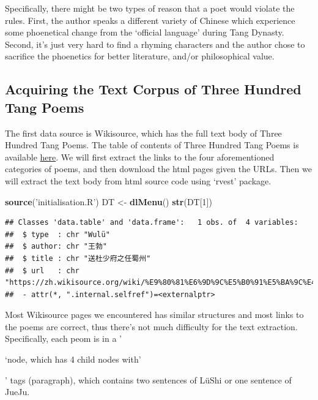 \documentclass[]{article}
\newenvironment{Shaded}{\begin{snugshade}}{\end{snugshade}}
\newcommand{\DecValTok}[1]{\textcolor[rgb]{0.00,0.00,0.81}{#1}}
\newcommand{\KeywordTok}[1]{\textcolor[rgb]{0.13,0.29,0.53}{\textbf{#1}}}
\newcommand{\NormalTok}[1]{#1}
\newcommand{\StringTok}[1]{\textcolor[rgb]{0.31,0.60,0.02}{#1}}
\begin{document}
Specifically, there might be two types of reason that a poet would
violate the rules. First, the author speaks a different variety of
Chinese which experience some phoenetical change from the `official
language' during Tang Dynasty. Second, it's just very hard to find a
rhyming characters and the author chose to sacrifice the phoenetics for
better literature, and/or philosophical value.

\hypertarget{acquiring-the-text-corpus-of-three-hundred-tang-poems}{%
\subsection{Acquiring the Text Corpus of Three Hundred Tang
Poems}\label{acquiring-the-text-corpus-of-three-hundred-tang-poems}}

The first data source is Wikisource, which has the full text body of
Three Hundred Tang Poems. The table of contents of Three Hundred Tang
Poems is available
\href{'https://zh.wikisource.org/wiki/唐詩三百首'}{here}. We will first
extract the links to the four aforementioned categories of poems, and
then download the html pages given the URLs. Then we will extract the
text body from html source code using `rvest' package.

\begin{Shaded}
\begin{Highlighting}[]
\KeywordTok{source}\NormalTok{(}\StringTok{'initialisation.R'}\NormalTok{)}
\NormalTok{DT <-}\StringTok{ }\KeywordTok{dlMenu}\NormalTok{()}
\KeywordTok{str}\NormalTok{(DT[}\DecValTok{1}\NormalTok{])}
\end{Highlighting}
\end{Shaded}

\begin{verbatim}
## Classes 'data.table' and 'data.frame':   1 obs. of  4 variables:
##  $ type  : chr "Wulü"
##  $ author: chr "王勃"
##  $ title : chr "送杜少府之任蜀州"
##  $ url   : chr "https://zh.wikisource.org/wiki/%E9%80%81%E6%9D%9C%E5%B0%91%E5%BA%9C%E4%B9%8B%E4%BB%BB%E8%9C%80%E5%B7%9E"
##  - attr(*, ".internal.selfref")=<externalptr>
\end{verbatim}

Most Wikisource pages we encountered has similar structures and most
links to the poems are correct, thus there's not much difficulty for the
text extraction. Specifically, each peom is in a '

`node, which has 4 child nodes with'

' tags (paragraph), which contains two sentences of LüShi or one
sentence of JueJu.
\end{document}
